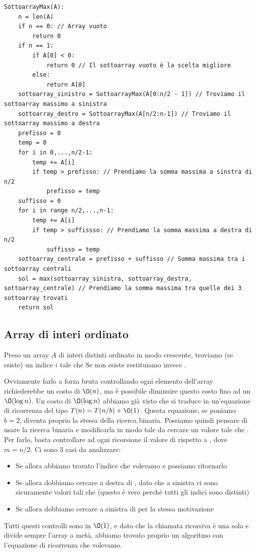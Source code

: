 \documentclass[11pt, a4paper, titlepage, oneside]{scrbook}
\begin{document}
\begin{lstlisting}
SottoarrayMax(A):
    n = len(A)
    if n == 0: // Array vuoto
        return 0
    if n == 1:
        if A[0] < 0:
            return 0 // Il sottoarray vuoto è la scelta migliore
        else:
            return A[0]
    sottoarray_sinistro = SottoarrayMax(A[0:n/2 - 1]) // Troviamo il sottoarray massimo a sinistra
    sottoarray_destro = SottoarrayMax(A[n/2:n-1]) // Troviamo il sottoarray massimo a destra
    prefisso = 0
    temp = 0
    for i in 0,...,n/2-1:
        temp += A[i]
        if temp > prefisso: // Prendiamo la somma massima a sinstra di n/2
            prefisso = temp
    suffisso = 0
    for i in range n/2,...,n-1:
        temp += A[i]
        if temp > suffissso: // Prendiamo la somma massima a destra di n/2
            suffisso = temp
    sottoarray_centrale = prefisso + suffisso // Somma massima tra i sottoarray centrali
    sol = max(sottoarray_sinistra, sottoarray_destra, sottoarray_centrale) // Prendiamo la somma massima tra quelle dei 3 sottoarray trovati
    return sol
\end{lstlisting}

\subsection{Array di interi ordinato}

Preso un array $A$ di interi distinti ordinato in modo crescente, troviamo (se esiste) un indice $i$ tale che  Se non esiste restituiamo invece .

Ovviamente farlo a forza bruta controllando ogni elemento dell'array richiederebbe un costo di $\O(n)$, ma è possibile diminuire questo costo fino ad un $\O(\log n)$. Un costo di $\O(\log n)$ abbiamo già visto che si traduce in un'equazione di ricorrenza del tipo $T(n) = T(n/b) + \O(1)$. Questa equazione, se poniamo $b = 2$, diventa proprio la stessa della ricerca binaria. Possiamo quindi pensare di usare la ricerca binaria e modificarla in modo tale da cercare un valore tale che \mbox{}. Per farlo, basta controllare ad ogni ricorsione il valore di  rispetto a , dove $m = n/2$. Ci sono 3 casi da analizzare:
\begin{itemize}
    \item Se  allora abbiamo trovato l'indice che volevamo e possiamo ritornarlo
    \item Se  allora dobbiamo cercare a destra di , dato che a sinistra ci sono sicuramente valori  tali che  (questo è vero perché tutti gli indici sono distinti)
    \item Se  allora dobbiamo cercare a sinistra di  per la stessa motivazione
\end{itemize}
Tutti questi controlli sono in $\O(1)$, e dato che la chiamata ricorsiva è una sola e divide sempre l'array a metà, abbiamo trovato proprio un algoritmo con l'equazione di ricorrenza che volevamo.
\end{document}
